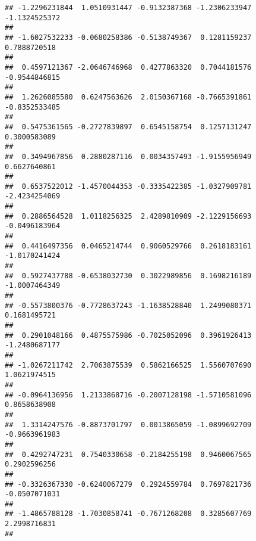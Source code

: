 \documentclass[]{article}
\begin{document}
\begin{verbatim}
## -1.2296231844  1.0510931447 -0.9132387368 -1.2306233947 -1.1324525372 
##                                                                       
## -1.6027532233 -0.0680258386 -0.5138749367  0.1281159237  0.7888720518 
##                                                                       
##  0.4597121367 -2.0646746968  0.4277863320  0.7044181576 -0.9544846815 
##                                                                       
##  1.2626085580  0.6247563626  2.0150367168 -0.7665391861 -0.8352533485 
##                                                                       
##  0.5475361565 -0.2727839897  0.6545158754  0.1257131247  0.3000583089 
##                                                                       
##  0.3494967856  0.2880287116  0.0034357493 -1.9155956949  0.6627640861 
##                                                                       
##  0.6537522012 -1.4570044353 -0.3335422385 -1.0327909781 -2.4234254069 
##                                                                       
##  0.2886564528  1.0118256325  2.4289810909 -2.1229156693 -0.0496183964 
##                                                                       
##  0.4416497356  0.0465214744  0.9060529766  0.2618183161 -1.0170241424 
##                                                                       
##  0.5927437788 -0.6538032730  0.3022989856  0.1698216189 -1.0007464349 
##                                                                       
## -0.5573800376 -0.7728637243 -1.1638528840  1.2499080371  0.1681495721 
##                                                                       
##  0.2901048166  0.4875575986 -0.7025052096  0.3961926413 -1.2480687177 
##                                                                       
## -1.0267211742  2.7063875539  0.5862166525  1.5560707690  1.0621974515 
##                                                                       
## -0.0964136956  1.2133868716 -0.2007128198 -1.5710581096  0.8658638908 
##                                                                       
##  1.3314247576 -0.8873701797  0.0013865059 -1.0899692709 -0.9663961983 
##                                                                       
##  0.4292747231  0.7540330658 -0.2184255198  0.9460067565  0.2902596256 
##                                                                       
## -0.3326367330 -0.6240067279  0.2924559784  0.7697821736 -0.0507071031 
##                                                                       
## -1.4865788128 -1.7030858741 -0.7671268208  0.3285607769  2.2998716831 
##                                                                       

\end{verbatim}
\end{document}
